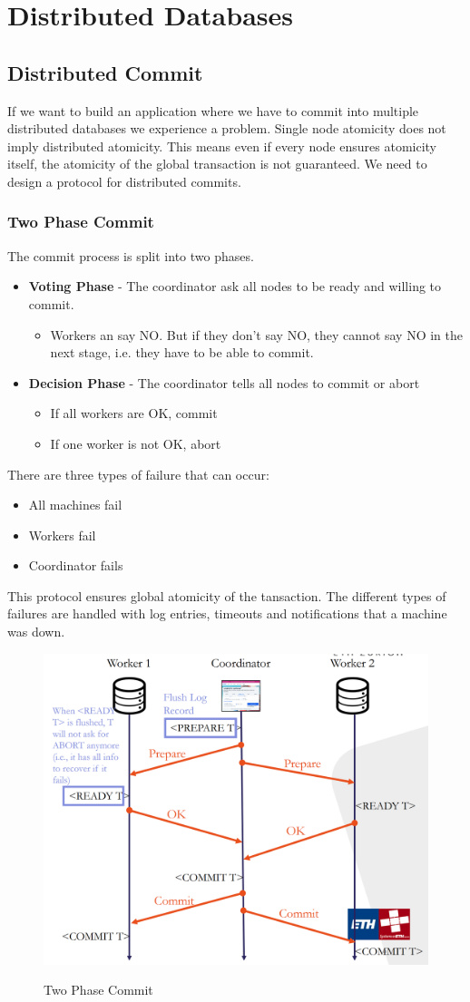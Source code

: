 \section{Distributed Databases}
\subsection{Distributed Commit}
If we want to build an application where we have to commit into multiple distributed databases we experience a problem. Single node atomicity does not imply distributed atomicity. This means even if every node ensures atomicity itself, the atomicity of the global transaction is not guaranteed. We need to design a protocol for distributed commits.

\subsubsection{Two Phase Commit}
The commit process is split into two phases. 
\begin{itemize}
\item \textbf{Voting Phase} - The coordinator ask all nodes to be ready and willing to commit.
\begin{itemize}
\item Workers an say NO. But if they don't say NO, they cannot say NO in the next stage, i.e. they have to be able to commit.
\end{itemize}
\item \textbf{Decision Phase} - The coordinator tells all nodes to commit or abort
\begin{itemize}
\item If all workers are OK, commit
\item If one worker is not OK, abort
\end{itemize}
\end{itemize}
There are three types of failure that can occur:
\begin{itemize}
\item All machines fail
\item Workers fail
\item Coordinator fails
\end{itemize}
This protocol ensures global atomicity of the tansaction. The different types of failures are handled with log entries, timeouts and notifications that a machine was down.
\begin{figure}[H]
\centering
\includegraphics[width=.7\textwidth]{images/TPC.PNG}
\label{TPC}
\caption{Two Phase Commit}
\end{figure}
